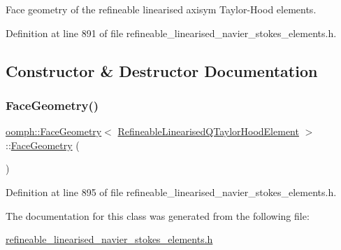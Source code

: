 Face geometry of the refineable linearised axisym Taylor-\/\+Hood elements. 

Definition at line 891 of file refineable\+\_\+linearised\+\_\+navier\+\_\+stokes\+\_\+elements.\+h.



\subsection{Constructor \& Destructor Documentation}
\mbox{\label{classoomph_1_1FaceGeometry_3_01RefineableLinearisedQTaylorHoodElement_01_4_ae1395700e28670539e65baa44d1e40b3}} 
\subsubsection{\texorpdfstring{Face\+Geometry()}{FaceGeometry()}}
{\footnotesize\ttfamily \hyperlink{classoomph_1_1FaceGeometry}{oomph\+::\+Face\+Geometry}$<$ \hyperlink{classoomph_1_1RefineableLinearisedQTaylorHoodElement}{Refineable\+Linearised\+Q\+Taylor\+Hood\+Element} $>$\+::\hyperlink{classoomph_1_1FaceGeometry}{Face\+Geometry} (\begin{DoxyParamCaption}{ }\end{DoxyParamCaption})\hspace{0.3cm}{\ttfamily [inline]}}



Definition at line 895 of file refineable\+\_\+linearised\+\_\+navier\+\_\+stokes\+\_\+elements.\+h.



The documentation for this class was generated from the following file\+:\begin{DoxyCompactItemize}
\item 
\hyperlink{refineable__linearised__navier__stokes__elements_8h}{refineable\+\_\+linearised\+\_\+navier\+\_\+stokes\+\_\+elements.\+h}\end{DoxyCompactItemize}
